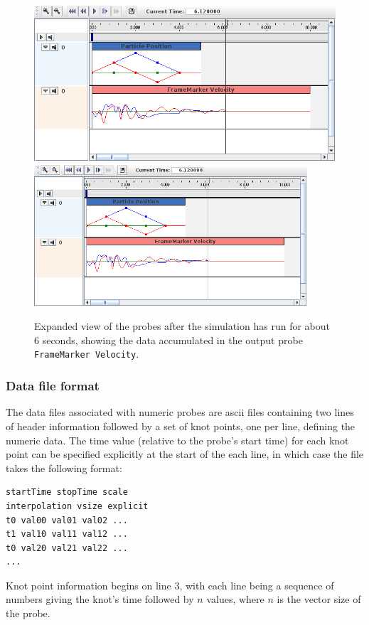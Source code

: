 \begin{figure}[t]
\begin{center}
\iflatexml
 \includegraphics[]{images/timelineProbesExpanded}
\else
 \includegraphics[width=4in]{images/timelineProbesExpanded}
\fi
\end{center}
\caption{Expanded view of the probes after the simulation has run for
about 6 seconds, showing the data accumulated in the output probe {\tt
FrameMarker Velocity}.}
\label{probesExpanded:fig}
\end{figure}


\subsubsection{Data file format}
\label{DataFileFormat:sec}

The data files associated with numeric probes are ascii files
containing two lines of header information followed by a set of knot
points, one per line, defining the numeric data. The time value
(relative to the probe's start time) for each knot point can be
specified explicitly at the start of the each line, in which case the
file takes the following format:
%
\begin{lstlisting}
startTime stopTime scale
interpolation vsize explicit
t0 val00 val01 val02 ...
t1 val10 val11 val12 ...
t0 val20 val21 val22 ...
...
\end{lstlisting}
%
Knot point information begins on line 3, with each line being a
sequence of numbers giving the knot's time followed by $n$ values,
where $n$ is the vector size of the probe.


